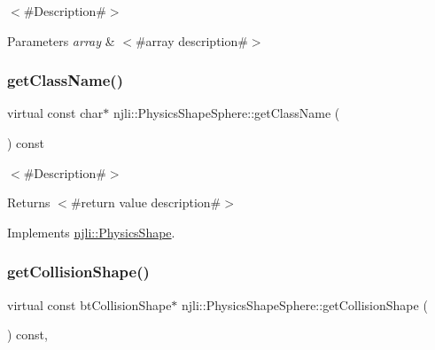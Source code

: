 $<$\#\+Description\#$>$


\begin{DoxyParams}{Parameters}
{\em array} & $<$\#array description\#$>$ \\
\hline
\end{DoxyParams}
\mbox{\label{classnjli_1_1_physics_shape_sphere_ac5c2b0aa40a78763720fc47fe3d6693d}} 
\subsubsection{\texorpdfstring{get\+Class\+Name()}{getClassName()}}
{\footnotesize\ttfamily virtual const char$\ast$ njli\+::\+Physics\+Shape\+Sphere\+::get\+Class\+Name (\begin{DoxyParamCaption}{ }\end{DoxyParamCaption}) const\hspace{0.3cm}{\ttfamily [virtual]}}

$<$\#\+Description\#$>$

\begin{DoxyReturn}{Returns}
$<$\#return value description\#$>$ 
\end{DoxyReturn}


Implements \mbox{\hyperlink{classnjli_1_1_physics_shape_a72cb98a55614a3e264b8e4a157b45c64}{njli\+::\+Physics\+Shape}}.

\mbox{\label{classnjli_1_1_physics_shape_sphere_a75ab9287d8f5c36ea782f4b7fb9535d6}} 
\subsubsection{\texorpdfstring{get\+Collision\+Shape()}{getCollisionShape()}\hspace{0.1cm}{\footnotesize\ttfamily [1/2]}}
{\footnotesize\ttfamily virtual const bt\+Collision\+Shape$\ast$ njli\+::\+Physics\+Shape\+Sphere\+::get\+Collision\+Shape (\begin{DoxyParamCaption}{ }\end{DoxyParamCaption}) const\hspace{0.3cm}{\ttfamily [protected]}, {\ttfamily [virtual]}}



